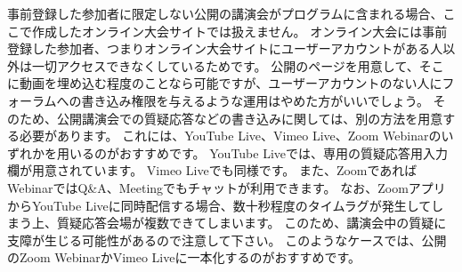 \documentclass[titlepage,10pt,a4paper,uplatex]{jsbook}
\begin{document}
事前登録した参加者に限定しない公開の講演会がプログラムに含まれる場合、ここで作成したオンライン大会サイトでは扱えません。
オンライン大会には事前登録した参加者、つまりオンライン大会サイトにユーザーアカウントがある人以外は一切アクセスできなくしているためです。
公開のページを用意して、そこに動画を埋め込む程度のことなら可能ですが、ユーザーアカウントのない人にフォーラムへの書き込み権限を与えるような運用はやめた方がいいでしょう。
そのため、公開講演会での質疑応答などの書き込みに関しては、別の方法を用意する必要があります。
これには、YouTube Live、Vimeo Live、Zoom Webinarのいずれかを用いるのがおすすめです。
YouTube Liveでは、専用の質疑応答用入力欄が用意されています。
Vimeo Liveでも同様です。
また、ZoomであればWebinarではQ\&A、Meetingでもチャットが利用できます。
なお、ZoomアプリからYouTube Liveに同時配信する場合、数十秒程度のタイムラグが発生してしまう上、質疑応答会場が複数できてしまいます。
このため、講演会中の質疑に支障が生じる可能性があるので注意して下さい。
このようなケースでは、公開のZoom WebinarかVimeo Liveに一本化するのがおすすめです。
\end{document}
